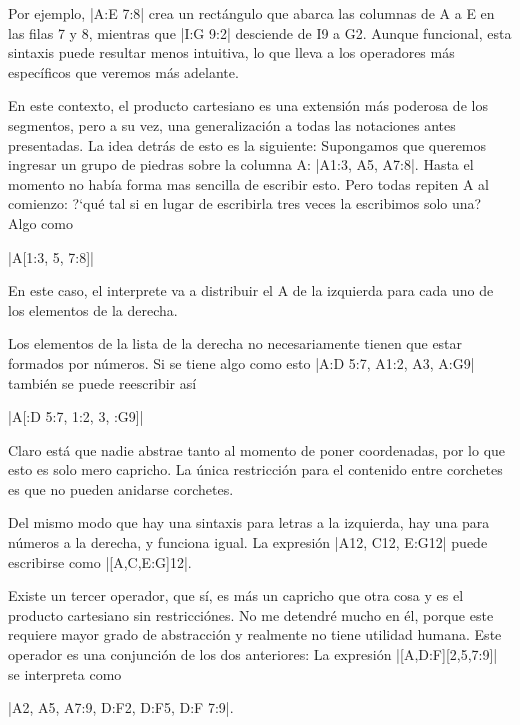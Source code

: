 \begin{goban}[9, stone = {radius = 4pt}, mark = {line = {color = red}}]
Por ejemplo, |A:E 7:8| crea un rectángulo que abarca las columnas de A a E en las filas 7 y 8, mientras que |I:G 9:2| desciende de I9 a G2. Aunque funcional, esta sintaxis puede resultar menos intuitiva, lo que lleva a los operadores más específicos que veremos más adelante.


	En este contexto, el producto cartesiano es una extensi\'on m\'as poderosa de los segmentos, pero a su vez, una generalizaci\'on a todas las notaciones antes presentadas. La idea detr\'as de esto es la siguiente: Supongamos que queremos ingresar un grupo de piedras sobre la columna A: |A1:3, A5, A7:8|. Hasta el momento no hab\'ia forma mas sencilla de escribir esto. Pero todas repiten A al comienzo: ?`qu\'e tal si en lugar de escribirla tres veces la escribimos solo una? Algo como
	\begin{center}
		|A[1:3, 5, 7:8]|
	\end{center}
	En este caso, el interprete va a distribuir el A de la izquierda para cada uno de los elementos de la derecha.
	
	Los elementos de la lista de la derecha no necesariamente tienen que estar formados por n\'umeros. Si se tiene algo como esto |A:D 5:7, A1:2, A3, A:G9| tambi\'en se puede reescribir as\'i
	\begin{center}
		|A[:D 5:7, 1:2, 3, :G9]|
	\end{center}
	Claro est\'a que nadie abstrae tanto al momento de poner coordenadas, por lo que esto es solo mero capricho. La \'unica restricci\'on para el contenido entre corchetes es que no pueden anidarse corchetes. 
	
	Del mismo modo que hay una sintaxis para letras a la izquierda, hay una para n\'umeros a la derecha, y funciona igual. La expresi\'on |A12, C12, E:G12| puede escribirse como |[A,C,E:G]12|.
	
	Existe un tercer operador, que s\'i, es m\'as un capricho que otra cosa y es el producto cartesiano sin restricci\'ones. No me detendr\'e mucho en \'el, porque este requiere mayor grado de abstracci\'on y realmente no tiene utilidad humana. Este operador es una conjunci\'on de los dos anteriores: La expresi\'on |[A,D:F][2,5,7:9]| se interpreta como
	\begin{center}
		|A2, A5, A7:9, D:F2, D:F5, D:F 7:9|.
	\end{center}
 
	\begin{codeexample}[width=4cm]
		\begin{goban}
			\stones[b]{[A, D:F][2, 5, 7:9]}
		\end{goban}
	\end{codeexample}


\end{goban}
